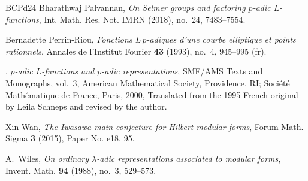 \documentclass[10pt]{amsart}
\numberwithin{equation}{section}
\theoremstyle{definition}
\theoremstyle{remark} %
\begin{document}
\begin{thebibliography}{BCPd24}
Bharathwaj Palvannan, \emph{On {S}elmer groups and factoring {$p$}-adic {$L$}-functions}, Int. Math. Res. Not. IMRN (2018), no.~24, 7483--7554. 

Bernadette {Perrin-Riou}, \emph{Fonctions {$L\, p$}-adiques d{\textquoteright}une courbe elliptique et points rationnels}, Annales de l'Institut Fourier \textbf{43} (1993), no.~4, 945--995 (fr). 

\bysame, \emph{{$p$}-adic {$L$}-functions and {$p$}-adic representations}, SMF/AMS Texts and Monographs, vol.~3, American Mathematical Society, Providence, RI; Soci\'et\'e{} Math\'ematique de France, Paris, 2000, Translated from the 1995 French original by Leila Schneps and revised by the author. 

Xin Wan, \emph{The {I}wasawa main conjecture for {H}ilbert modular forms}, Forum Math. Sigma \textbf{3} (2015), Paper No. e18, 95. 

A.~Wiles, \emph{On ordinary {$\lambda$}-adic representations associated to modular forms}, Invent. Math. \textbf{94} (1988), no.~3, 529--573. 

\end{thebibliography}
\end{document}
